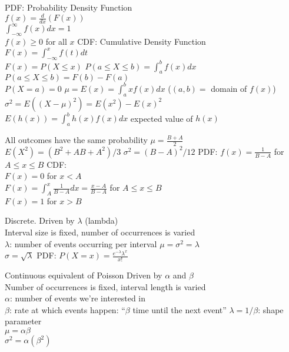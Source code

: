 \documentclass{article}
\begin{document}
\begin{multicols*}{2}
\begin{outline}[compactitem]
  \1 PDF: Probability Density Function
  \\ $f(x) = \frac{d}{dx}(F(x))$
  \\ $\int_{-\infty}^{\infty}f(x) dx = 1$
  \\ $f(x) \geq 0$ for all $x$
  \1 CDF: Cumulative Density Function
  \\ $F(x) = \int_{-\infty}^{x} f(t) dt$
  \\ $F(x) = P(X \leq x)$
  \1 $P(a \leq X \leq b) = \int_a^b f(x) dx$
  \\   $P(a \leq X \leq b) = F(b) - F(a)$ 
  \\   $P(X=a) = 0$
  \1 $\mu = E(x) = \int_a^b x f(x) dx$ ($(a,b)=$ domain of $f(x)$)
  \\ $\sigma^2 = E((X-\mu)^2) = E(x^2) - E(x)^2$
  \\ $E(h(x)) = \int_a^b h(x) f(x) dx$ expected value of $h(x)$

  \1 All outcomes have the same probability
  \1 $\mu = \frac{B+A}{2}$
  \1 $E(X^2) = (B^2 + AB + A^2)/3$
  \1 $\sigma^2 = (B-A)^2/12$
  \1 PDF: $f(x) = \frac{1}{B-A}$ for $A\leq x \leq B$
  \1 CDF:
  \\   $F(x) = 0$ for $x < A$
  \\   $F(x) = \int_{A}^{x} \frac{1}{B-A} dx = \frac{x-A}{B-A}$ for $A\leq x \leq B$
  \\   $F(x) = 1$ for $x > B$

  \1 Discrete. Driven by $\lambda$ (lambda)
  \\ Interval size is fixed, number of occurrences is varied
  \\ $\lambda$: number of events occurring per interval
  \1 $\mu = \sigma^2 = \lambda$
  \\ $\sigma = \sqrt{\lambda}$
  \1 PDF: $P(X=x) = \frac{e^{-\lambda}\lambda^x}{x!}$

  \1 Continuous equivalent of Poisson
  \1 Driven by $\alpha$ and $\beta$
  \\ Number of occurrences is fixed, interval length is varied
  \\ $\alpha$: number of events we're interested in
  \\ $\beta$: rate at which events happen: ``$\beta$ time until the next event''
  \1 $\lambda = 1/\beta$: shape parameter
  \\ $\mu = \alpha\beta$
  \\ $\sigma^2 = \alpha(\beta^2)$


\end{outline}
\end{multicols*}
\end{document}
